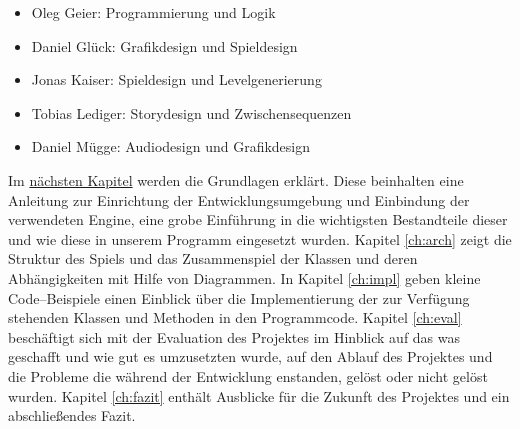 \begin{itemize}

\item Oleg Geier: Programmierung und Logik

\item Daniel Glück: Grafikdesign und Spieldesign

\item Jonas Kaiser: Spieldesign und Levelgenerierung

\item Tobias Lediger: Storydesign und Zwischensequenzen

\item Daniel Mügge: Audiodesign und Grafikdesign
	
\end{itemize}



\label{sec:1_Dokumentationsstruktur}
Im \href{ch:grundl}{nächsten Kapitel} werden die Grundlagen erklärt. Diese beinhalten eine Anleitung zur Einrichtung der Entwicklungsumgebung und Einbindung der verwendeten Engine, eine grobe Einführung in die wichtigsten Bestandteile dieser und wie diese in unserem Programm eingesetzt wurden. 
Kapitel \ref{ch:arch} zeigt die Struktur des Spiels und das Zusammenspiel der Klassen und deren Abhängigkeiten mit Hilfe von Diagrammen.
In Kapitel \ref{ch:impl} geben kleine Code--Beispiele einen Einblick über die Implementierung der zur Verfügung stehenden Klassen und Methoden in den Programmcode.
Kapitel \ref{ch:eval} beschäftigt sich mit der Evaluation des Projektes im Hinblick auf das was geschafft und wie gut es umzusetzten wurde, auf den Ablauf des Projektes und die Probleme die während der Entwicklung enstanden, gelöst oder nicht gelöst wurden.
Kapitel \ref{ch:fazit} enthält Ausblicke für die Zukunft des Projektes und ein abschließendes Fazit.


